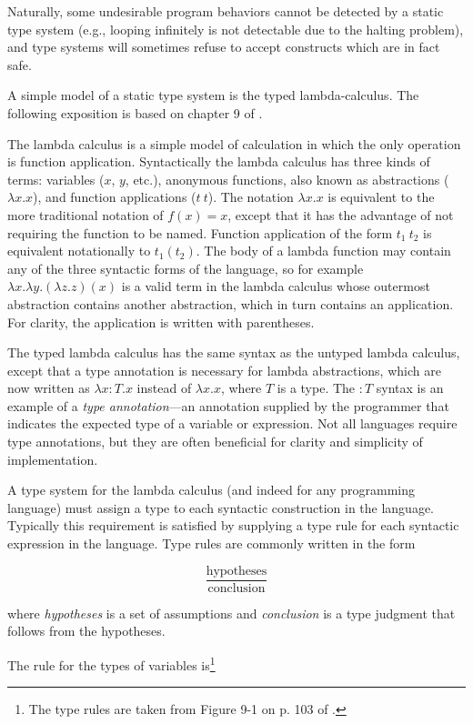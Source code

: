 \documentclass{article}
\begin{document}
Naturally, some undesirable program behaviors cannot be detected by a static type system (e.g., looping infinitely is not detectable due to the halting problem), and type systems will sometimes refuse to accept constructs which are in fact safe.

A simple model of a static type system is the typed lambda-calculus. The following exposition is based on chapter 9 of \cite{types}.

The lambda calculus is a simple model of calculation in which the only operation is function application. Syntactically the lambda calculus has three kinds of terms: variables ($x$, $y$, etc.), anonymous functions, also known as abstractions ($\lambda x . x$), and function applications ($t\ t$). The notation $\lambda x . x$ is equivalent to the more traditional notation of $f(x) = x$, except that it has the advantage of not requiring the function to be named. Function application of the form $t_1\ t_2$ is equivalent notationally to $t_1(t_2)$. The body of a lambda function may contain any of the three syntactic forms of the language, so for example $\lambda x . \lambda y . (\lambda z . z)(x)$ is a valid term in the lambda calculus whose outermost abstraction contains another abstraction, which in turn contains an application. For clarity, the application is written with parentheses.

The typed lambda calculus has the same syntax as the untyped lambda calculus, except that a type annotation is necessary for lambda abstractions, which are now written as $\lambda x: T . x$ instead of $\lambda x. x$, where $T$ is a type. The $: T$ syntax is an example of a \textit{type annotation}---an annotation supplied by the programmer that indicates the expected type of a variable or expression. Not all languages require type annotations, but they are often beneficial for clarity and simplicity of implementation.

A type system for the lambda calculus (and indeed for any programming language) must assign a type to each syntactic construction in the language. Typically this requirement is satisfied by supplying a type rule for each syntactic expression in the language. Type rules are commonly written in the form

\[
\frac{\text{hypotheses}}
{\text{conclusion}}
\]

where \textit{hypotheses} is a set of assumptions and \textit{conclusion} is a type judgment that follows from the hypotheses.

The rule for the types of variables is\footnote{The type rules are taken from Figure 9-1 on p. 103 of \cite{types}.}
\end{document}
